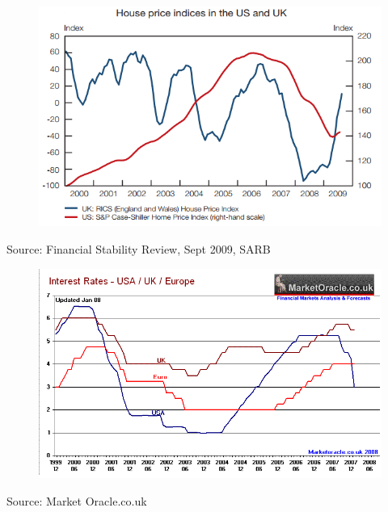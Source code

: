 \documentclass[11pt]{beamer}
\begin{document}
\begin{frame}
\begin{figure}
\includegraphics[width=1\textwidth]{Figures/HPUS.png}
\end{figure}
\tiny{Source: Financial Stability Review, Sept 2009, SARB}
\end{frame}


\begin{frame}
\begin{figure}
\includegraphics[width=1\textwidth]{Figures/Intrate.png}
\end{figure}
\tiny{Source: Market Oracle.co.uk}
\end{frame}
\end{document}
